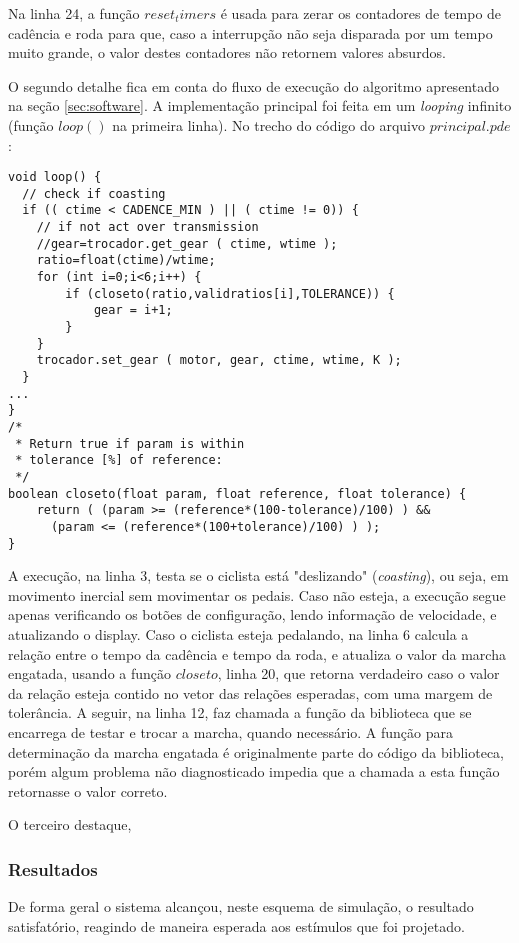 \documentclass[a4paper,11pt]{article}
\begin{document}
Na linha 24, a função $reset_timers$ é usada para zerar os contadores de tempo
de cadência e roda para que, caso a interrupção não seja disparada por um tempo
muito grande, o valor destes contadores não retornem valores absurdos.

O segundo detalhe fica em conta do fluxo de execução do algoritmo apresentado
na seção \ref{sec:software}. A implementação principal foi feita em um
\textit{looping} infinito (função $loop()$ na primeira linha). No trecho do
código do arquivo $principal.pde$:

\begin{lstlisting}
void loop() {
  // check if coasting
  if (( ctime < CADENCE_MIN ) || ( ctime != 0)) {
    // if not act over transmission
    //gear=trocador.get_gear ( ctime, wtime );
    ratio=float(ctime)/wtime;
    for (int i=0;i<6;i++) {
        if (closeto(ratio,validratios[i],TOLERANCE)) {
            gear = i+1;
        }
    }
    trocador.set_gear ( motor, gear, ctime, wtime, K );
  }
...
}
/*
 * Return true if param is within
 * tolerance [%] of reference:
 */
boolean closeto(float param, float reference, float tolerance) {
    return ( (param >= (reference*(100-tolerance)/100) ) &&
      (param <= (reference*(100+tolerance)/100) ) );
}
\end{lstlisting}
A execução, na linha 3, testa se o ciclista está "deslizando"
(\textit{coasting}), ou seja, em movimento inercial sem movimentar os pedais.
Caso não esteja, a execução segue apenas verificando os botões de configuração,
lendo informação de velocidade, e atualizando o display. Caso o ciclista esteja
pedalando, na linha 6 calcula a relação entre o tempo da cadência e tempo da
roda, e atualiza o valor da marcha engatada, usando a função $closeto$,
linha 20, que retorna verdadeiro caso o valor da relação esteja contido no
vetor das relações esperadas, com uma margem de tolerância. A seguir, na linha
12, faz chamada a função da biblioteca que se encarrega de testar e trocar a
marcha, quando necessário.
A função para determinação da marcha engatada é originalmente parte do código da
biblioteca, porém algum problema não diagnosticado impedia que a chamada a esta
função retornasse o valor correto.

O terceiro destaque, 

\subsubsection{Resultados}

De forma geral o sistema alcançou, neste esquema de simulação, o resultado
satisfatório, reagindo de maneira esperada aos estímulos que foi projetado.
\end{document}
